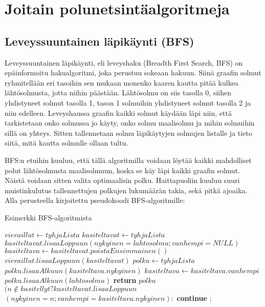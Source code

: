 \chapter{Joitain polunetsintäalgoritmeja}\label{joitainP}

\section{Leveyssuuntainen läpikäynti (BFS)}\label{bfs}
Leveyssuuntainen läpikäynti, eli leveyshaku (Breadth First Search, BFS) on 
epäinformoitu hakualgoritmi, joka perustuu sokeaan 
hakuun.\cite{applSciLawande} Siinä graafin solmut ryhmitellään eri tasoihin 
sen mukaan monenko kaaren kautta pitää kulkea lähtösolmusta, jotta niihin 
päästään. Lähtösolmu on siis tasolla 0, siihen yhdistyneet solmut tasolla 1, 
tason 1 solmuihin yhdistyneet solmut tasolla 2 ja niin edelleen. 
Leveyshaussa graafin kaikki solmut käydään läpi niin, että tarkistetaan 
onko solmussa jo käyty, onko solmu maalisolmu ja mihin solmuihin sillä on 
yhteys. Sitten tallennetaan solmu läpikäytyjen solmujen listalle ja tieto 
siitä, mitä kautta solmulle ollaan tultu.\cite{BFSRahim} \par
	BFS:n etuihin kuuluu, että tällä algoritmilla voidaan löytää kaikki 
mahdolliset polut lähtösolmusta maalisolmuun, koska se käy läpi kaikki graafin 
solmut.\cite{BFSRahim} Näistä voidaan sitten valita optimaalisin polku.
Haittapuoliin kuuluu suuri muistinkulutus tallennettujen polkujen 
lukumäärän takia,\cite{BFSRahim} sekä pitkä ajoaika.\cite{mazeGameTrilogi} 
Alla \textcite{applSciLawande} perusteella kirjoitettu pseudokoodi 
BFS-algoritmille:
\begin{algorithm}[H]
\caption{Esimerkki BFS-algoritmista}\label{BFSEsim}
\begin{algoritmic}
	\State $vieraillut \gets tyhjaLista$
	\State $kasiteltavat \gets tyhjaLista$
	\State $kasiteltavat.lisaaLoppuun(nykyinen=lahtosolmu;vanhempi=NULL)$
		\State $kasiteltava \gets kasiteltavat.poistaEnsimmainen()$
		\State $vieraillut.lisaaLoppuun(kasiteltavat)$
			\State $polku \gets tyhjaLista$
				\State $polku.lisaaAlkuun(kasiteltava.nykyinen)$
				\State $kasiteltava \gets kasiteltava.vanhempi$
			\EndWhile
			\State $polku.lisaaAlkuun(lahtosolmu)$
			\State \textbf{return} $polku$
		\Else
				\State $(n \not\in kasitellyt ?  kasiteltavat.lisaaLoppuun$
				\State $(nykyinen = n;vanhempi = kasiteltava.nykyinen) :$
				\State \textbf{continue} $;$
			\EndFor
		\EndIf
	\EndWhile
\EndProcedure
\end{algoritmic}
\end{algorithm}

